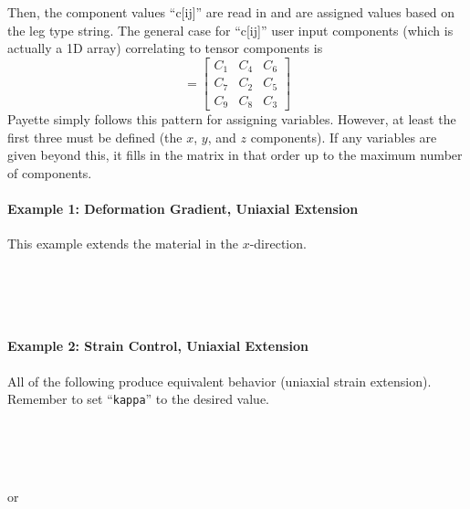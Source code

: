 \documentclass[11pt]{article}
\newcommand{\levelo}{\indent\hspace{.2in}}
\newcommand{\levelt}{\indent\hspace{.4in}}
\newcommand{\shparam}{\texttt{kappa}}
\begin{document}
Then, the component values ``c[ij]'' are read in and are assigned values based on
the leg type string. The general case for ``c[ij]'' user input components (which
is actually a 1D array) correlating to tensor components is
%
\begin{equation}
  [C] = \left[ \begin{array}{ccc} C_{1} & C_{4} & C_{6} \\ C_{7} & C_{2} & C_{5}\\ C_{9} & C_{8} & C_{3} \end{array}\right]
\end{equation}
%
Payette simply follows this pattern for assigning variables. However, at least the
first three must be defined (the $x$, $y$, and $z$ components). If any variables
are given beyond this, it fills in the matrix in that order up to the maximum
number of components.

\paragraph{Example 1: Deformation Gradient, Uniaxial Extension}
This example extends the material in the $x$-direction.

\levelo{}\\
\levelt{}\\
\levelt{}\\
\levelo{}

\paragraph{Example 2: Strain Control, Uniaxial Extension}
All of the following produce equivalent behavior (uniaxial strain extension).
Remember to set ``\shparam{}'' to the desired value.

\levelo{}\\
\levelt{}\\
\levelt{}\\
\levelo{}

\noindent or

\levelo{}\\
\levelt{}\\
\levelt{}\\
\levelo{}
\end{document}
